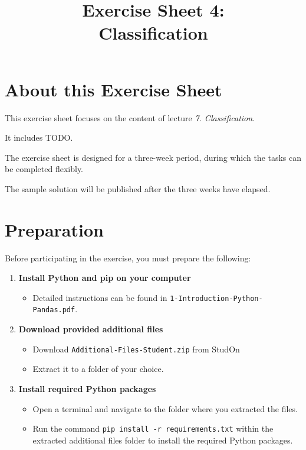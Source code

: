 \documentclass[
english,
smallborders
]{i6prcsht}
\begin{document}
\title{Exercise Sheet 4: \\ Classification}
\maketitle
\vspace*{-2cm}

\section*{About this Exercise Sheet}

This exercise sheet focuses on the content of lecture \textit{7. Classification}.

It includes TODO.

The exercise sheet is designed for a three-week period, during which the tasks can be completed flexibly.

The sample solution will be published after the three weeks have elapsed.

\section*{Preparation}

Before participating in the exercise, you must prepare the following:

\begin{enumerate}
	\item \textbf{Install Python and pip on your computer}

	      \begin{itemize}
		      \item Detailed instructions can be found in \texttt{1-Introduction-Python-Pandas.pdf}.
	      \end{itemize}

	\item \textbf{Download provided additional files}

	      \begin{itemize}
		      \item Download \texttt{Additional-Files-Student.zip} from StudOn
		      \item Extract it to a folder of your choice.
	      \end{itemize}

	\item \textbf{Install required Python packages}

	      \begin{itemize}
		      \item Open a terminal and navigate to the folder where you extracted the files.
		      \item Run the command \texttt{pip install -r requirements.txt} within the extracted additional files folder to install the required Python packages.
	      \end{itemize}


\end{enumerate}
\end{document}
